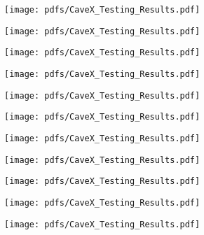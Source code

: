\label{app:MATLAB-code}
\texttt{[image: pdfs/CaveX\_Testing\_Results.pdf]}
\newpage

\texttt{[image: pdfs/CaveX\_Testing\_Results.pdf]}
\newpage

\texttt{[image: pdfs/CaveX\_Testing\_Results.pdf]}
\newpage

\texttt{[image: pdfs/CaveX\_Testing\_Results.pdf]}
\newpage

\texttt{[image: pdfs/CaveX\_Testing\_Results.pdf]}
\newpage

\texttt{[image: pdfs/CaveX\_Testing\_Results.pdf]}
\newpage

\texttt{[image: pdfs/CaveX\_Testing\_Results.pdf]}
\newpage

\texttt{[image: pdfs/CaveX\_Testing\_Results.pdf]}
\newpage

\texttt{[image: pdfs/CaveX\_Testing\_Results.pdf]}
\newpage

\texttt{[image: pdfs/CaveX\_Testing\_Results.pdf]}
\newpage

\texttt{[image: pdfs/CaveX\_Testing\_Results.pdf]}